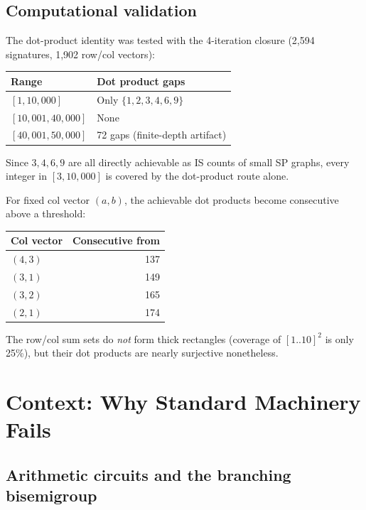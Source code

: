 \documentclass[11pt,a4paper]{article}
\theoremstyle{definition}
\theoremstyle{remark}
\begin{document}
\subsection{Computational validation}

The dot-product identity was tested with the 4-iteration closure (2{,}594 signatures, 1{,}902 row/col vectors):

\begin{center}
\begin{tabular}{ll}
\toprule
Range & Dot product gaps \\
\midrule
$[1, 10{,}000]$ & Only $\{1, 2, 3, 4, 6, 9\}$ \\
$[10{,}001, 40{,}000]$ & None \\
$[40{,}001, 50{,}000]$ & 72 gaps (finite-depth artifact) \\
\bottomrule
\end{tabular}
\end{center}

Since $3, 4, 6, 9$ are all directly achievable as IS counts of small SP graphs, every integer in $[3, 10{,}000]$ is covered by the dot-product route alone.

For fixed col vector $(a, b)$, the achievable dot products become consecutive above a threshold:

\begin{center}
\begin{tabular}{lr}
\toprule
Col vector & Consecutive from \\
\midrule
$(4, 3)$ & 137 \\
$(3, 1)$ & 149 \\
$(3, 2)$ & 165 \\
$(2, 1)$ & 174 \\
\bottomrule
\end{tabular}
\end{center}

The row/col sum sets do \emph{not} form thick rectangles (coverage of $[1..10]^2$ is only 25\%), but their dot products are nearly surjective nonetheless.

\section{Context: Why Standard Machinery Fails}

\subsection{Arithmetic circuits and the branching bisemigroup}
\end{document}
